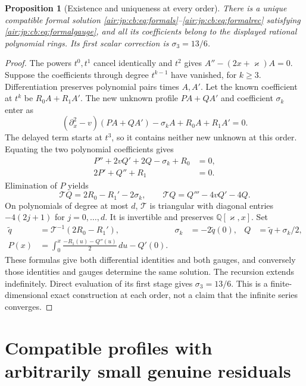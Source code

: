\documentclass[11pt,letterpaper]{article}
\numberwithin{equation}{section}
\newtheorem{proposition}[theorem]{Proposition}
\theoremstyle{remark}
\newcommand{\Q}{\mathbb{Q}}
\begin{document}
\begin{proposition}[Existence and uniqueness at every order]\label{air:jp:cb:prop:formal}
There is a unique compatible formal solution \eqref{air:jp:cb:eq:formals}--\eqref{air:jp:cb:eq:formalrec} satisfying \eqref{air:jp:cb:eq:formalgauge}, and all its coefficients belong to the displayed rational polynomial rings. Its first scalar correction is $\sigma_3=13/6$.
\end{proposition}
\begin{proof}
The powers $t^0,t^1$ cancel identically and $t^2$ gives $A''-(2x+\varkappa)A=0$. Suppose the coefficients through degree $t^{k-1}$ have vanished, for $k\ge3$. Differentiation preserves polynomial pairs times $A,A'$. Let the known coefficient at $t^k$ be $R_0A+R_1A'$. The new unknown profile $PA+QA'$ and coefficient $\sigma_k$ enter as
\[
 (\partial_x^2-v)(PA+QA')-\sigma_kA+R_0A+R_1A'=0.
\]
The delayed term starts at $t^3$, so it contains neither new unknown at this order. Equating the two polynomial coefficients gives
\begin{align*}
 P''+2vQ'+2Q-\sigma_k+R_0&=0,\\
 2P'+Q''+R_1&=0.
\end{align*}
Elimination of $P$ yields
\[
 \mathcal TQ=2R_0-R_1'-2\sigma_k,\qquad
 \mathcal TQ=Q'''-4vQ'-4Q.
\]
On polynomials of degree at most $d$, $\mathcal T$ is triangular with diagonal entries $-4(2j+1)$ for $j=0,\ldots,d$. It is invertible and preserves $\Q[\varkappa,x]$. Set
\begin{align*}
 \widetilde q&=\mathcal T^{-1}(2R_0-R_1'),&
 \sigma_k&=-2\widetilde q(0),&Q&=\widetilde q+\sigma_k/2,\\
 P(x)&=\int_0^x\frac{-R_1(u)-Q''(u)}2\,du-Q'(0).
\end{align*}
These formulas give both differential identities and both gauges, and conversely those identities and gauges determine the same solution. The recursion extends indefinitely. Direct evaluation of its first stage gives $\sigma_3=13/6$. This is a finite-dimensional exact construction at each order, not a claim that the infinite series converges.
\end{proof}

\section{Compatible profiles with arbitrarily small genuine residuals}\label{air:jp:cb:sec:profiles}
\end{document}
